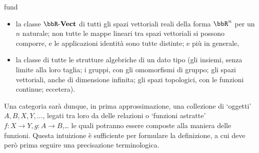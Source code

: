 \begin{hExample}{fund}
 \begin{itemize}
  \item {} la classe \(\ctVect[\bbR]\) di tutti gli spazi vettoriali reali della forma \(\bbR^n\) per un \(n\) naturale; non tutte le mappe lineari tra spazi vettoriali si possono comporre, e le applicazioni identità sono tutte distinte; e più in generale,
  \item la classe di tutte le strutture algebriche di un dato tipo (gli insiemi, senza limite alla loro taglia; i gruppi, con gli omomorfismi di gruppo; gli spazi vettoriali, anche di dimensione infinita; gli spazi topologici, con le funzioni continue; eccetera).
 \end{itemize}
\end{hExample}
Una categoria sarà dunque, in prima approssimazione, una collezione di `oggetti' \(A,B,X,Y,\dots\), legati tra loro da delle relazioni o `funzioni astratte' \(f \colon X\to Y, g \colon A\to B\),\dots{} le quali potranno essere composte alla maniera delle funzioni. Questa intuizione è sufficiente per formulare la definizione, a cui deve però prima seguire una precisazione terminologica.
